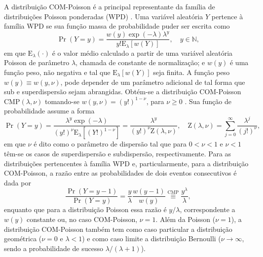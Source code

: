 \documentclass[
    oldfontcommands,
    11pt,
    openright,
    twoside,
    a4paper,
    english,
    brazil
]{abntex2}\usepackage[]{graphicx}\usepackage[]{color}
\begin{document}
A distribuição COM-Poisson é a principal representante da família de
distribuições Poisson ponderadas (WPD) \citep{DelCastillo1998}. Uma
variável aleatória $Y$ pertence à família WPD se sua função massa de
probabilidade puder ser escrita como
\begin{equation}
  \label{eqn:pmf-wpd}
  \Pr(Y = y) = \frac{w(y) \exp(-\lambda)\lambda^y}{
    y! \text{E}_\lambda[w(Y)]}, \quad y \in \mathbb{N},
\end{equation}
em que $\text{E}_\lambda(\cdot)$ é o valor médio calculado a partir de
uma variável aleatória Poisson de parâmetro $\lambda$, chamada de
constante de normalização; e $w(y)$ é uma função peso, não negativa e
tal que $\text{E}_\lambda[w(Y)]$ seja finita. A função peso
$w(y) \equiv w(y, \nu)$, pode depender de um parâmetro adicional de tal
forma que sub e superdispersão sejam abrangidas. Obtém-se a distribuição
COM-Poisson CMP$(\lambda, \nu)$ tomando-se $w(y, \nu) = (y!)^{1-\nu}$,
para $\nu \geq 0$ \citep{Sellers2012}. Sua função de probabilidade
assume a forma
\begin{equation}
  \label{eqn:pmf-compoisson}
  \Pr(Y = y) = \frac{\lambda^y \exp(-\lambda)}{
    (y!)^\nu \text{E}_\lambda[(Y!)^{1-\nu}]} =
  \frac{\lambda^y}{(y!)^\nu \text{Z}(\lambda, \nu)}, \quad
  \text{Z}(\lambda,\nu) = \sum_{j=0}^\infty \frac{\lambda^j}{(j!)^\nu},
\end{equation}
em que $\nu$ é dito como o parâmetro de dispersão tal que para $0<\nu<1$
e $\nu<1$ têm-se os casos de superdispersão e subdispersão,
respectivamente.  Para as distribuições pertencentes à família WPD e,
particularmente, para a distribuição COM-Poisson, a razão entre as
probabilidades de dois eventos consecutivos é dada por
\begin{equation}
  \frac{\Pr(Y = y - 1)}{\Pr(Y = y)} =
    \frac{y}{\lambda}\frac{w(y-1)}{w(y)} \overset{\text{CMP}}{\equiv}
    \frac{y^\lambda}{\lambda},
\end{equation}
enquanto que para a distribuição Poisson essa razão é $y /\lambda$,
correspondente a $w(y)$ constante ou, no caso COM-Poisson, $\nu=1$. Além
da Poisson ($\nu=1$), a distribuição COM-Poisson também tem como caso
particular a distribuição geométrica ($\nu=0$ e $\lambda<1$) e como caso
limite a distribuição Bernoulli ($\nu\to \infty$, sendo a probabilidade
de sucesso $\lambda/(\lambda+1)$).
\end{document}
